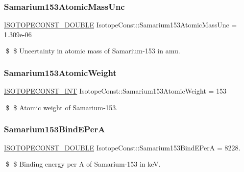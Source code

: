\subsubsection{\texorpdfstring{Samarium153\+Atomic\+Mass\+Unc}{Samarium153AtomicMassUnc}}
{\footnotesize\ttfamily \mbox{\hyperlink{group___isotope_const-_macros_ga8f45a7272ce02c0b4c65c44636ed719a}{I\+S\+O\+T\+O\+P\+E\+C\+O\+N\+S\+T\+\_\+\+D\+O\+U\+B\+LE}} Isotope\+Const\+::\+Samarium153\+Atomic\+Mass\+Unc = 1.\+309e-\/06}

\$ \$ Uncertainty in atomic mass of Samarium-\/153 in amu. \mbox{\label{group___isotope_const-_samarium-_sm153_ga466e4d5ea17bbceed2d6589859b8e99d}} 
\subsubsection{\texorpdfstring{Samarium153\+Atomic\+Weight}{Samarium153AtomicWeight}}
{\footnotesize\ttfamily \mbox{\hyperlink{group___isotope_const-_macros_ga5f18360b3e99483a35c32d789e62621c}{I\+S\+O\+T\+O\+P\+E\+C\+O\+N\+S\+T\+\_\+\+I\+NT}} Isotope\+Const\+::\+Samarium153\+Atomic\+Weight = 153}

\$ \$ Atomic weight of Samarium-\/153. \mbox{\label{group___isotope_const-_samarium-_sm153_ga4d36e6af72f4e1e86fcf16cf0537a760}} 
\subsubsection{\texorpdfstring{Samarium153\+Bind\+E\+PerA}{Samarium153BindEPerA}}
{\footnotesize\ttfamily \mbox{\hyperlink{group___isotope_const-_macros_ga8f45a7272ce02c0b4c65c44636ed719a}{I\+S\+O\+T\+O\+P\+E\+C\+O\+N\+S\+T\+\_\+\+D\+O\+U\+B\+LE}} Isotope\+Const\+::\+Samarium153\+Bind\+E\+PerA = 8228.}

\$ \$ Binding energy per A of Samarium-\/153 in keV. \mbox{\label{group___isotope_const-_samarium-_sm153_gad0781acd429e99f9ff87f897e07f64c4}} 
